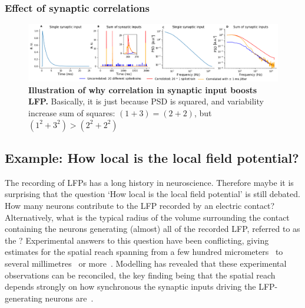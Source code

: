 \subsubsection{Effect of synaptic correlations}
\begin{figure}[!ht]
\begin{center}
\includegraphics[width=1.\textwidth]{Figures/LFP_effect_correlation_illustration.png}
\end{center}
\caption{\textbf{Illustration of why correlation in synaptic input boosts LFP.}
Basically, it is just because PSD is squared, and variability increase sum of squares: $(1+3) = (2 +2)$, but $(1^2 + 3^2) > (2^2 + 2^2)$
}
\label{fig:correlation_boost}
\end{figure}

\subsection{Example: How local is the  local field potential?}
\label{LFP:sec:how-local-is-the-local-field-potential}

The recording of LFPs has a long history in neuroscience. Therefore maybe it is surprising that the question 
`How local is the local field potential' is still debated. How many neurons contribute to the LFP 
recorded by an electric contact? Alternatively, what is the typical radius of the volume surrounding the contact containing
the neurons generating (almost) all of the recorded LFP,  referred to as the ? 
Experimental answers to this question have been conflicting, giving estimates for the spatial reach spanning from
a few hundred micrometers~\citep{Katzner2009,Xing2009} to several millimetres~\citep{Kreiman2006} or more~\citep{Kajikawa2011}.
Modelling has revealed that these experimental observations can be reconciled, the key finding being that the spatial reach depends strongly
on how synchronous the synaptic inputs driving the LFP-generating neurons are~\citep{Linden2011}.


